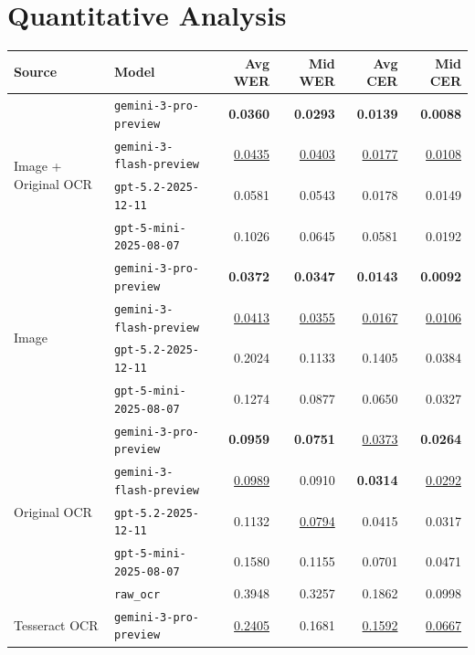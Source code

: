 \section{Quantitative Analysis}
\begin{table}[htbp]
\centering
\small
\setlength{\tabcolsep}{6pt}
\renewcommand{\arraystretch}{1.2}
\begin{tabular}{llrrrr}
\toprule
\textbf{Source} & \textbf{Model} & \textbf{Avg WER} & \textbf{Mid WER} & \textbf{Avg CER} & \textbf{Mid CER} \\
\midrule
\multirow{4}{*}{Image + Original OCR}
 & \texttt{gemini-3-pro-preview}    & \textbf{0.0360} & \textbf{0.0293} & \textbf{0.0139} & \textbf{0.0088} \\
 & \texttt{gemini-3-flash-preview}  & \underline{0.0435} & \underline{0.0403} & \underline{0.0177} & \underline{0.0108} \\
 & \texttt{gpt-5.2-2025-12-11}      & 0.0581 & 0.0543 & 0.0178 & 0.0149 \\
 & \texttt{gpt-5-mini-2025-08-07}   & 0.1026 & 0.0645 & 0.0581 & 0.0192 \\
\midrule
\multirow{4}{*}{Image}
 & \texttt{gemini-3-pro-preview}    & \textbf{0.0372} & \textbf{0.0347} & \textbf{0.0143} & \textbf{0.0092} \\
 & \texttt{gemini-3-flash-preview}  & \underline{0.0413} & \underline{0.0355} & \underline{0.0167} & \underline{0.0106} \\
 & \texttt{gpt-5.2-2025-12-11}      & 0.2024 & 0.1133 & 0.1405 & 0.0384 \\
 & \texttt{gpt-5-mini-2025-08-07}   & 0.1274 & 0.0877 & 0.0650 & 0.0327 \\
\midrule
\multirow{5}{*}{Original OCR}
 & \texttt{gemini-3-pro-preview}    & \textbf{0.0959} & \textbf{0.0751} & \underline{0.0373} & \textbf{0.0264} \\
 & \texttt{gemini-3-flash-preview}  & \underline{0.0989} & 0.0910 & \textbf{0.0314} & \underline{0.0292} \\
 & \texttt{gpt-5.2-2025-12-11}      & 0.1132 & \underline{0.0794} & 0.0415 & 0.0317 \\
 & \texttt{gpt-5-mini-2025-08-07}   & 0.1580 & 0.1155 & 0.0701 & 0.0471 \\
 & \texttt{raw\_ocr}                & 0.3948 & 0.3257 & 0.1862 & 0.0998 \\
\midrule
\multirow{5}{*}{Tesseract OCR}
 & \texttt{gemini-3-pro-preview}    & \underline{0.2405} & 0.1681 & \underline{0.1592} & \underline{0.0667} \\

\end{tabular}
\end{table}
